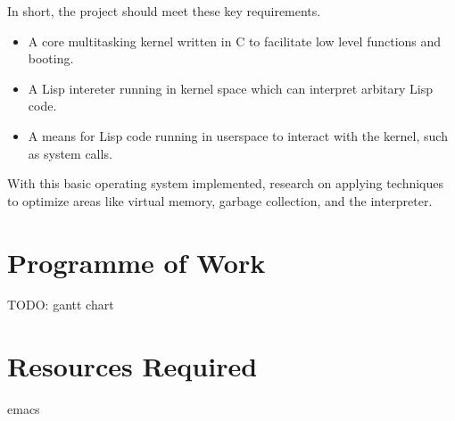 \documentclass{article}
\begin{document}
  In short, the project should meet these key requirements.
  \begin{itemize}
  \item A core multitasking kernel written in C to facilitate low level functions and booting.
  \item A Lisp intereter running in kernel space which can interpret arbitary Lisp code.
  \item A means for Lisp code running in userspace to interact with the kernel, such as system calls.
  \end{itemize}

  With this basic operating system implemented, research on applying techniques to optimize areas like virtual memory, garbage collection, and the interpreter.

  \section{Programme of Work}
  TODO: gantt chart

  \section{Resources Required}
  emacs

  
  
  
\end{document}

